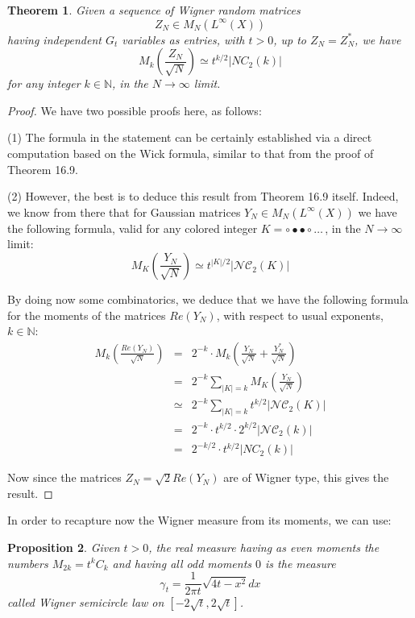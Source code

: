 \documentclass[12pt]{amsbook}
\newtheorem{theorem}{Theorem}[chapter]
\newtheorem{proposition}[theorem]{Proposition}
\begin{document}
\begin{theorem}
Given a sequence of Wigner random matrices
$$Z_N\in M_N(L^\infty(X))$$
having independent $G_t$ variables as entries, with $t>0$, up to $Z_N=Z_N^*$, we have
$$M_k\left(\frac{Z_N}{\sqrt{N}}\right)\simeq t^{k/2}|NC_2(k)|$$
for any integer $k\in\mathbb N$, in the $N\to\infty$ limit.
\end{theorem}

\begin{proof}
We have two possible proofs here, as follows:

\medskip

(1) The formula in the statement can be certainly established via a direct computation based on the Wick formula, similar to that from the proof of Theorem 16.9.

\medskip

(2) However, the best is to deduce this result from Theorem 16.9 itself. Indeed, we know from there that for Gaussian matrices $Y_N\in M_N(L^\infty(X))$ we have the following formula, valid for any colored integer $K=\circ\bullet\bullet\circ\ldots\,$, in the $N\to\infty$ limit:
$$M_K\left(\frac{Y_N}{\sqrt{N}}\right)\simeq t^{|K|/2}|\mathcal{NC}_2(K)|$$

By doing now some combinatorics, we deduce that we have the following formula for the moments of the matrices $Re(Y_N)$, with respect to usual exponents, $k\in\mathbb N$:
\begin{eqnarray*}
M_k\left(\frac{Re(Y_N)}{\sqrt{N}}\right)
&=&2^{-k}\cdot M_k\left(\frac{Y_N}{\sqrt{N}}+\frac{Y_N^*}{\sqrt{N}}\right)\\
&=&2^{-k}\sum_{|K|=k}M_K\left(\frac{Y_N}{\sqrt{N}}\right)\\
&\simeq&2^{-k}\sum_{|K|=k}t^{k/2}|\mathcal{NC}_2(K)|\\
&=&2^{-k}\cdot t^{k/2}\cdot 2^{k/2}|\mathcal{NC}_2(k)|\\
&=&2^{-k/2}\cdot t^{k/2}|NC_2(k)|
\end{eqnarray*}

Now since the matrices $Z_N=\sqrt{2}Re(Y_N)$ are of Wigner type, this gives the result.
\end{proof}

In order to recapture now the Wigner measure from its moments, we can use:

\begin{proposition}
Given $t>0$, the real measure having as even moments the numbers $M_{2k}=t^kC_k$ and having all odd moments $0$ is the measure
$$\gamma_t=\frac{1}{2\pi t}\sqrt{4t-x^2}dx$$
called Wigner semicircle law on $[-2\sqrt{t},2\sqrt{t}]$.
\end{proposition}
\end{document}
